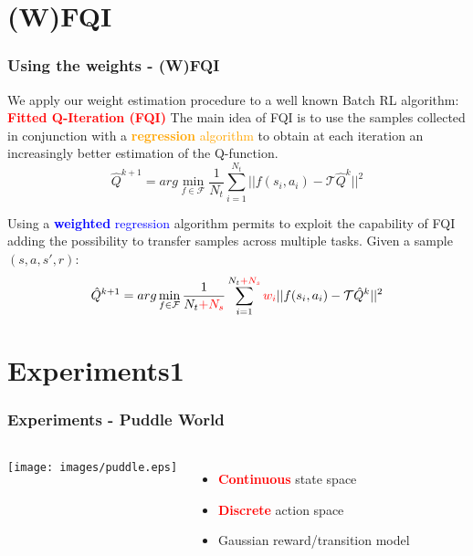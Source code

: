 \documentclass[professionalfont]{beamer}
\begin{document}
    \section{(W)FQI}
      \begin{frame}
      \frametitle{Using the weights - (W)FQI}
        We apply our weight estimation procedure to a well known Batch RL
        algorithm: \textcolor{red}{\textbf{Fitted Q-Iteration (FQI)}} \newline
        \pause
        The main idea of FQI is to use the samples collected in conjunction
        with a \textcolor{orange}{\textbf{regression} algorithm} to obtain at each iteration
        an increasingly better estimation of the Q-function. \newline
        \begin{equation*}
          \hat{Q}^{k+1} = arg\min_{f \in \mathcal{F}} \frac{1}{N_{t}} \sum_{i=1}^{N_t} ||f(s_{i}, a_{i}) - \mathcal{T}\hat{Q}^{k}||^{2}
        \end{equation*}
        \pause

        Using a \textcolor{blue}{\textbf{weighted} regression} algorithm permits to exploit the
        capability of FQI adding the possibility to transfer samples across
        multiple tasks.\newline
        \pause
        Given a sample $(s,a,s',r)$:
        \begin{equation*}
          \hat{Q}^{k+1} = arg\min_{f \in \mathcal{F}} \frac{1}{N_{t}\textcolor{red}{+N_{s}}} \sum_{i=1}^{N_{t}\textcolor{red}{+N_{s}}} \textcolor{red}{w_{i}}||f(s_{i}, a_{i}) - \mathcal{T}\hat{Q}^{k}||^{2}
        \end{equation*}
      \end{frame}

    \section{Experiments1}
      \begin{frame}
      \frametitle{Experiments - Puddle World}

      \begin{columns}
        \texttt{[image: images/puddle.eps]}

        \begin{itemize}
          \item \textcolor{red}{\textbf{Continuous}} state space
          \item \textcolor{red}{\textbf{Discrete}} action space
          \item Gaussian reward/transition model
        \end{itemize}
      \end{columns}

      \end{frame}
\end{document}
